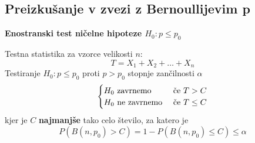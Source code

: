 \documentclass[11pt]{article}
\begin{document}
	\subsection{Preizkušanje v zvezi z Bernoullijevim p}
	\begin{framed}
		\begin{center}
			\textbf{Enostranski test ničelne hipoteze $H_0: p\le p_0$}
		\end{center}
		Testna statistika za vzorce velikosti $n$:
		$$T = X_1 + X_2 +\ldots + X_n$$
		Testiranje $H_0: p\le p_0$ proti $p > p_0$ stopnje zančilnosti $\alpha$
			\[
		\begin{cases}
		H_0 \textnormal{ zavrnemo } & \textnormal{če } T> C\\
		H_0 \textnormal{ ne zavrnemo } & \textnormal{če }  T\le C
		\end{cases}
		\]
		kjer je $C$ \textbf{najmanjše} tako celo število, za katero je 
		$$P(B(n,p_0) > C) = 1 - P(B(n,p_0) \le C) \le \alpha$$
	\end{framed}
	
\end{document}

